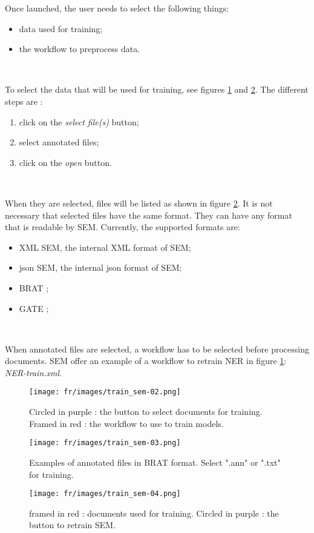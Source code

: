 \documentclass[manual-fr.tex]{subfiles}
\begin{document}
Once launched, the user needs to select the following things:
\begin{itemize}
    \item data used for training;
    \item the workflow to preprocess data.
\end{itemize}

~

To select the data that will be used for training, see figures \ref{fig:train_sem-02} and \ref{fig:train_sem-03}. The different steps are :
\begin{enumerate}
    \item click on the \emph{select file(s)} button;
    \item select annotated files;
    \item click on the \emph{open} button.
\end{enumerate}

~

When they are selected, files will be listed as shown in figure \ref{fig:train_sem-03}. It is not necessary that selected files have the same format. They can have any format that is readable by SEM. Currently, the supported formats are:
\begin{itemize}
    \item XML SEM, the internal XML format of SEM;
    \item json SEM, the internal json format of SEM;
    \item BRAT \cite{stenetorp2012brat};
    \item GATE \cite{cunningham2002gate};
\end{itemize}

~

When annotated files are selected, a workflow has to be selected before processing documents. SEM offer an example of a workflow to retrain NER in figure \ref{fig:train_sem-02}: \emph{NER-train.xml}.

\begin{figure}[ht!]
    \begin{center}
    \texttt{[image: fr/images/train\_sem-02.png]}
    \end{center}
    \caption{Circled in purple : the button to select documents for training. Framed in red : the workflow to use to train models.}
    \label{fig:train_sem-02}
\end{figure}

\begin{figure}[ht!]
    \begin{center}
    \texttt{[image: fr/images/train\_sem-03.png]}
    \end{center}
    \caption{Examples of annotated files in BRAT format. Select ".ann" or ".txt" for training.}
    \label{fig:train_sem-03}
\end{figure}

\begin{figure}[ht!]
    \begin{center}
    \texttt{[image: fr/images/train\_sem-04.png]}
    \end{center}
    \caption{framed in red : documents used for training. Circled in purple : the button to retrain SEM.}
    \label{fig:train_sem-04}
\end{figure}
\end{document}
